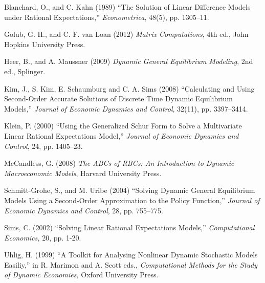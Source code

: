 \documentclass[a4j, dvipdfmx]{jarticle}
\begin{document}
\begin{thebibliography}{xxx}

Blanchard, O., and C. Kahn (1989) ``The Solution of Linear Difference Models under Rational Expectations,'' {\it Econometrica}, 48(5), pp. 1305--11.

Golub, G. H., and C. F. van Loan (2012) {\it Matrix Computations}, 4th ed., John Hopkins University Press.

Heer, B., and A. Maussner (2009) {\it Dynamic General Equilibrium Modeling}, 2nd ed., Splinger.

Kim, J., S. Kim, E. Schaumburg and C. A. Sims (2008) ``Calculating and Using Second-Order Accurate Solutions of Discrete Time Dynamic Equilibrium Models,'' {\it Journal of Economic Dynamics and Control}, 32(11), pp. 3397--3414.

Klein, P. (2000) ``Using the Generalized Schur Form to Solve a Multivariate Linear Rational Expectations Model,'' {\it Journal of Economic Dynamics and Control}, 24, pp. 1405--23.

McCandless, G. (2008) {\it The ABCs of RBCs: An Introduction to Dynamic Macroeconomic Models}, Harvard University Press.

Schmitt-Grohe, S., and M. Uribe (2004) ``Solving Dynamic General Equilibrium Models Using a Second-Order Approximation to the Policy Function,'' {\it Journal of Economic Dynamics and Control}, 28, pp. 755--775.

Sims, C. (2002) ``Solving Linear Rational Expectations Models,'' {\it Computational Economics,} 20, pp. 1-20.

Uhlig, H. (1999) ``A Toolkit for Analysing Nonlinear Dynamic Stochastic Models Easiliy,'' in R. Marimon and A. Scott eds., {\it Computational Methods for the Study of Dynamic Economies,} Oxford University Press.

\end{thebibliography}
\end{document}

